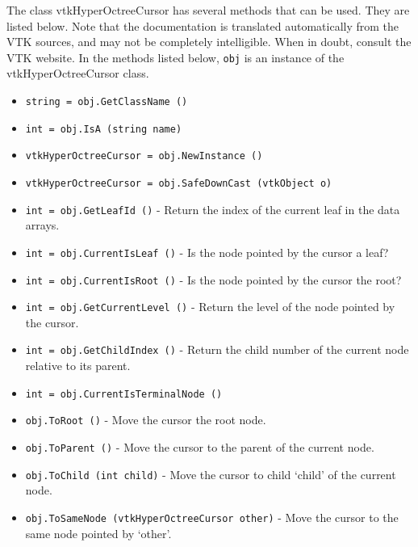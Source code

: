 The class vtkHyperOctreeCursor has several methods that can be used.
  They are listed below.
Note that the documentation is translated automatically from the VTK sources,
and may not be completely intelligible.  When in doubt, consult the VTK website.
In the methods listed below, \verb|obj| is an instance of the vtkHyperOctreeCursor class.
\begin{itemize}
\item  \verb|string = obj.GetClassName ()|

\item  \verb|int = obj.IsA (string name)|

\item  \verb|vtkHyperOctreeCursor = obj.NewInstance ()|

\item  \verb|vtkHyperOctreeCursor = obj.SafeDownCast (vtkObject o)|

\item  \verb|int = obj.GetLeafId ()| -  Return the index of the current leaf in the data arrays.
 

\item  \verb|int = obj.CurrentIsLeaf ()| -  Is the node pointed by the cursor a leaf?

\item  \verb|int = obj.CurrentIsRoot ()| -  Is the node pointed by the cursor the root?

\item  \verb|int = obj.GetCurrentLevel ()| -  Return the level of the node pointed by the cursor.
 

\item  \verb|int = obj.GetChildIndex ()| -  Return the child number of the current node relative to its parent.
 
 

\item  \verb|int = obj.CurrentIsTerminalNode ()|

\item  \verb|obj.ToRoot ()| -  Move the cursor the root node.
 
 

\item  \verb|obj.ToParent ()| -  Move the cursor to the parent of the current node.
 

\item  \verb|obj.ToChild (int child)| -  Move the cursor to child `child' of the current node.
 
 

\item  \verb|obj.ToSameNode (vtkHyperOctreeCursor other)| -  Move the cursor to the same node pointed by `other'.
 

\end{itemize}
